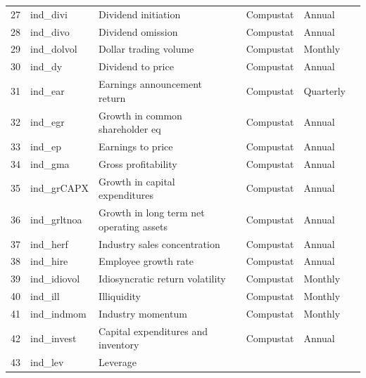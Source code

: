 \documentclass[a4paper, table]{article}
\begin{document}
\begin{landscape}
\begin{center}
\begin{longtable}{lllllll}
			27 & ind\_divi & Dividend initiation & 
				\cite{michaely_price_1995} & Compustat & Annual \\
			28 & ind\_divo & Dividend omission & 
				\cite{michaely_price_1995} & Compustat & Annual \\
			29 & ind\_dolvol & Dollar trading volume & 
				\cite{chordia_trading_2001} & Compustat & Monthly \\
			30 & ind\_dy & Dividend to price & 
				\cite{litzenberger_effects_1982} & Compustat & Annual \\
			31 & ind\_ear & Earnings announcement return & 
				\cite{brandt_earnings_2008} & Compustat & Quarterly \\
			32 & ind\_egr & Growth in common shareholder eq & 
				\cite{richardson_accrual_2005} & Compustat & Annual \\
			33 & ind\_ep & Earnings to price & 
				\cite{basu_investment_1977} & Compustat & Annual \\
			34 & ind\_gma & Gross profitability & 
				\cite{novy-marx_other_2013} & Compustat & Annual \\
			35 & ind\_grCAPX\footnotemark[\value{footnote}] & Growth in capital expenditures & 
				\cite{anderson_empirical_2006} & Compustat & Annual \\
			36 & ind\_grltnoa\footnotemark[\value{footnote}] & Growth in long term net operating assets & 
				\cite{fairfield_accrued_2003} & Compustat & Annual \\
			37 & ind\_herf & Industry sales concentration & 
				\cite{hou_industry_2006} & Compustat & Annual \\
			38 & ind\_hire & Employee growth rate & 
				\cite{belo_labor_2014} & Compustat & Annual \\
			39 & ind\_idiovol & Idiosyncratic return volatility & 
				\cite{ali_arbitrage_2003} & Compustat & Monthly \\
			40 & ind\_ill & Illiquidity & 
				\cite{amihud_illiquidity_2002} & Compustat & Monthly \\
			41 & ind\_indmom & Industry momentum & 
				\cite{moskowitz_industries_1999} & Compustat & Monthly \\
			42 & ind\_invest\footnotemark[\value{footnote}] & Capital expenditures and inventory & 
				\cite{chen_better_2010} & Compustat & Annual \\
			43 & ind\_lev & Leverage & 

\end{longtable}
\end{center}
\end{landscape}
\end{document}
